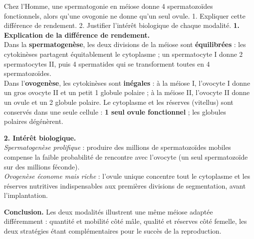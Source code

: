 \documentclass[11pt]{article}
\begin{document}
\begin{exoresolu}
Chez l'Homme, une spermatogonie en méiose donne 4 spermatozoïdes fonctionnels, alors qu'une ovogonie ne donne qu'un seul ovule. 1. Expliquer cette différence de rendement. 2. Justifier l'intérêt biologique de chaque modalité.
\tcblower
\textbf{1. Explication de la différence de rendement.}\\
Dans la \textbf{spermatogenèse}, les deux divisions de la méiose sont \textbf{équilibrées} : les cytokinèses partagent équitablement le cytoplasme ; un spermatocyte I donne 2 spermatocytes II, puis 4 spermatides qui se transforment toutes en 4 spermatozoïdes.\\
Dans l'\textbf{ovogenèse}, les cytokinèses sont \textbf{inégales} : à la méiose I, l'ovocyte I donne un gros ovocyte II et un petit 1 globule polaire ; à la méiose II, l'ovocyte II donne un ovule et un 2 globule polaire. Le cytoplasme et les réserves (vitellus) sont conservés dans une seule cellule : \textbf{1 seul ovule fonctionnel} ; les globules polaires dégénèrent.

\textbf{2. Intérêt biologique.}\\
\emph{Spermatogenèse prolifique} : produire des millions de spermatozoïdes mobiles compense la faible probabilité de rencontre avec l'ovocyte (un seul spermatozoïde sur des millions féconde).\\
\emph{Ovogenèse économe mais riche} : l'ovule unique concentre tout le cytoplasme et les réserves nutritives indispensables aux premières divisions de segmentation, avant l'implantation.

\textbf{Conclusion.} Les deux modalités illustrent une même méiose adaptée différemment : quantité et mobilité côté mâle, qualité et réserves côté femelle, les deux stratégies étant complémentaires pour le succès de la reproduction.
\end{exoresolu}
\end{document}

